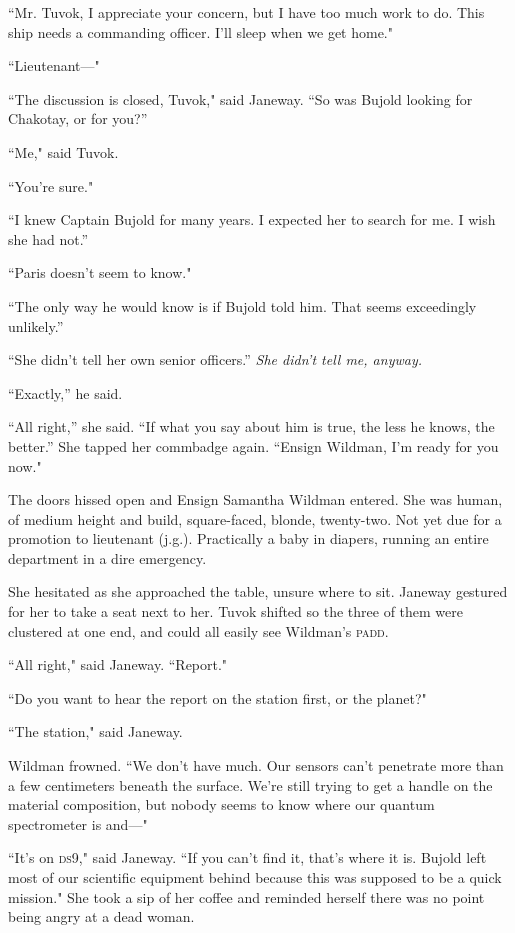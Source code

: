 \documentclass[twoside,letterpaper,12pt]{memoir}
\begin{document}
``Mr. Tuvok, I appreciate your concern, but I have too much work to do. This ship needs a commanding officer. I'll sleep when we get home."

``Lieutenant---"

``The discussion is closed, Tuvok," said Janeway. ``So was Bujold looking for Chakotay, or for you?''

``Me," said Tuvok.

``You're sure."

``I knew Captain Bujold for many years. I expected her to search for me. I wish she had not.''

``Paris doesn't seem to know."

``The only way he would know is if Bujold told him. That seems exceedingly unlikely.''

``She didn’t tell her own senior officers.'' \textit{She didn’t tell me, anyway.}

``Exactly,'' he said.

``All right,'' she said. ``If what you say about him is true, the less he knows, the better.'' She tapped her commbadge again. ``Ensign Wildman, I'm ready for you now."

The doors hissed open and Ensign Samantha Wildman entered. She was human, of medium height and build, square-faced, blonde, twenty-two. Not yet due for a promotion to lieutenant (j.g.). Practically a baby in diapers, running an entire department in a dire emergency.

She hesitated as she approached the table, unsure where to sit. Janeway gestured for her to take a seat next to her. Tuvok shifted so the three of them were clustered at one end, and could all easily see Wildman's \textsc{padd}.

``All right," said Janeway. ``Report."

``Do you want to hear the report on the station first, or the planet?"

``The station," said Janeway.

Wildman frowned. ``We don't have much. Our sensors can't penetrate more than a few centimeters beneath the surface. We're still trying to get a handle on the material composition, but nobody seems to know where our quantum spectrometer is and---"

``It's on \textsc{ds9}," said Janeway. ``If you can't find it, that's where it is. Bujold left most of our scientific equipment behind because this was supposed to be a quick mission." She took a sip of her coffee and reminded herself there was no point being angry at a dead woman.
\end{document}
